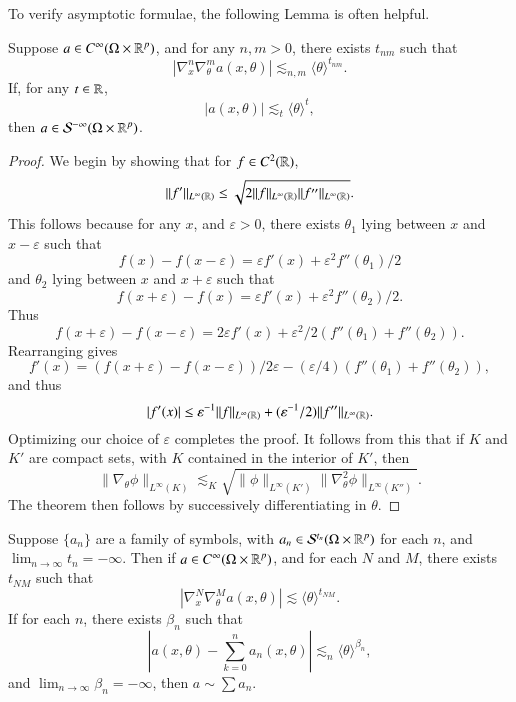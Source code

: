To verify asymptotic formulae, the following Lemma is often helpful.

\begin{lemma}
    Suppose $a \in C^\infty(\Omega \times \operatorname{\mathbb{R}}^p)$, and for any $n,m > 0$, there exists $t_{nm}$ such that
    \[ |\nabla^n_x \nabla^m_\theta a(x,\theta)| \lesssim_{n,m} \langle \theta \rangle^{t_{nm}}. \]
    If, for any $t \in \operatorname{\mathbb{R}}$,
    \[ |a(x,\theta)| \lesssim_t \langle \theta \rangle^t, \]
    then $a \in \mathcal{S}^{-\infty}(\Omega \times \operatorname{\mathbb{R}}^p)$.
\end{lemma}
\begin{proof}
    We begin by showing that for $f \in C^2(\operatorname{\mathbb{R}})$,
    \[ \| f' \|_{L^\infty(\operatorname{\mathbb{R}})} \leq \sqrt{2 \| f \|_{L^\infty(\operatorname{\mathbb{R}})} \| f'' \|_{L^\infty(\operatorname{\mathbb{R}})} }. \]
    This follows because for any $x$, and $\varepsilon > 0$, there exists $\theta_1$ lying between $x$ and $x - \varepsilon$ such that
    \[ f(x) - f(x-\varepsilon) = \varepsilon f'(x) + \varepsilon^2 f''(\theta_1) / 2 \]
    and $\theta_2$ lying between $x$ and $x + \varepsilon$ such that
    \[ f(x + \varepsilon) - f(x) = \varepsilon f'(x) + \varepsilon^2 f''(\theta_2)/2. \]
    Thus
    \[ f(x+\varepsilon) - f(x-\varepsilon) = 2 \varepsilon f'(x) + \varepsilon^2 / 2 (f''(\theta_1) + f''(\theta_2)). \]
    Rearranging gives
    \[ f'(x) = (f(x+\varepsilon) - f(x-\varepsilon))/2 \varepsilon - (\varepsilon / 4)(f''(\theta_1) + f''(\theta_2)), \]
    and thus
    \[ |f'(x)| \leq \varepsilon^{-1} \| f \|_{L^\infty(\operatorname{\mathbb{R}})} + (\varepsilon^{-1}/2) \| f'' \|_{L^\infty(\operatorname{\mathbb{R}})}. \]
    Optimizing our choice of $\varepsilon$ completes the proof. It follows from this that if $K$ and $K'$ are compact sets, with $K$ contained in the interior of $K'$, then
    \[ \| \nabla_\theta \phi \|_{L^\infty(K)} \lesssim_K \sqrt{\| \phi \|_{L^\infty(K')} \| \nabla_\theta^2 \phi \|_{L^\infty(K'')} }. \]
    The theorem then follows by successively differentiating in $\theta$.
\end{proof}

\begin{corollary}
    Suppose $\{ a_n \}$ are a family of symbols, with $a_n \in \mathcal{S}^{t_n}(\Omega \times \operatorname{\mathbb{R}}^p)$ for each $n$, and $\lim_{n \to \infty} t_n = -\infty$. Then if $a \in C^\infty(\Omega \times \operatorname{\mathbb{R}}^p)$, and for each $N$ and $M$, there exists $t_{NM}$ such that
    \[ |\nabla^N_x \nabla^M_\theta a(x,\theta)| \lesssim \langle \theta \rangle^{t_{NM}}. \]
    If for each $n$, there exists $\beta_n$ such that
    \[ |a(x,\theta) - \sum_{k = 0}^n a_n(x,\theta)| \lesssim_n \langle \theta \rangle^{\beta_n}, \]
    and $\lim_{n \to \infty} \beta_n = -\infty$, then $a \sim \sum a_n$.
\end{corollary}

